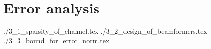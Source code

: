 \chapter {Error analysis}

 {./3_1_sparsity_of_channel.tex}
 {./3_2_design_of_beamformers.tex}
 {./3_3_bound_for_error_norm.tex}



